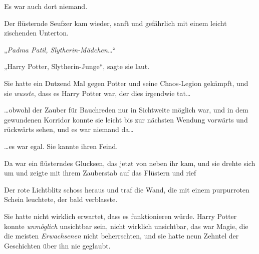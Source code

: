 Es war auch dort niemand.

Der flüsternde Seufzer kam wieder, sanft und gefährlich mit einem leicht zischenden Unterton.

„\emph{Padma Patil, Slytherin-Mädchen…}“

„Harry Potter, Slytherin-Junge“, sagte sie laut.

Sie hatte ein Dutzend Mal gegen Potter und seine Chaos-Legion gekämpft, und sie \emph{wusste}, dass es Harry Potter war, der dies irgendwie tat…

…obwohl der Zauber für Bauchreden nur in Sichtweite möglich war, und in dem gewundenen Korridor konnte sie leicht bis zur nächsten Wendung vorwärts und rückwärts sehen, und es war niemand da…

…es war egal. Sie kannte ihren Feind.

Da war ein flüsterndes Glucksen, das jetzt von neben ihr kam, und sie drehte sich um und zeigte mit ihrem Zauberstab auf das Flüstern und rief 

Der rote Lichtblitz schoss heraus und traf die Wand, die mit einem purpurroten Schein leuchtete, der bald verblasste.

Sie hatte nicht wirklich erwartet, dass es funktionieren würde. Harry Potter konnte \emph{unmöglich} unsichtbar sein, nicht wirklich unsichtbar, das war Magie, die die meisten \emph{Erwachsenen} nicht beherrschten, und sie hatte neun Zehntel der Geschichten über ihn nie geglaubt.

